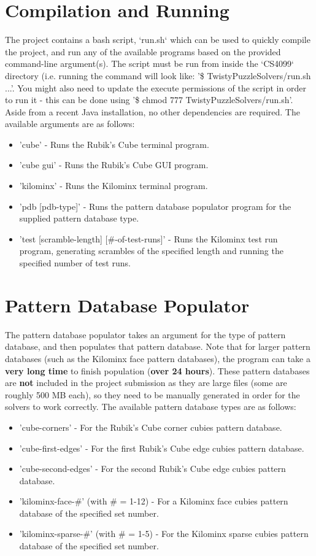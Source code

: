 \section{Compilation and Running}
The project contains a bash script, `run.sh` which can be used to quickly compile the project, and run any of the available programs based on the provided command-line argument(s). The script must be run from inside the `CS4099` directory (i.e. running the command will look like: '\$ TwistyPuzzleSolvers/run.sh ...'. You might also need to update the execute permissions of the script in order to run it - this can be done using '\$ chmod 777 TwistyPuzzleSolvers/run.sh'. Aside from a recent Java installation, no other dependencies are required. The available arguments are as follows:
\begin{itemize}
    \item 'cube' - Runs the Rubik's Cube terminal program.
    \item 'cube gui' - Runs the Rubik's Cube GUI program.
    \item 'kilominx' - Runs the Kilominx terminal program.
    \item 'pdb [pdb-type]' - Runs the pattern database populator program for the supplied pattern database type.
    \item 'test [scramble-length] [\#-of-test-runs]' - Runs the Kilominx test run program, generating scrambles of the specified length and running the specified number of test runs.
\end{itemize}

\section{Pattern Database Populator}
The pattern database populator takes an argument for the type of pattern database, and then populates that pattern database. Note that for larger pattern databases (such as the Kilominx face pattern databases), the program can take a \textbf{very long time} to finish population (\textbf{over 24 hours}). These pattern databases are \textbf{not} included in the project submission as they are large files (some are roughly 500 MB each), so they need to be manually generated in order for the solvers to work correctly. The available pattern database types are as follows:
\begin{itemize}
    \item 'cube-corners' - For the Rubik's Cube corner cubies pattern database.
    \item 'cube-first-edges' - For the first Rubik's Cube edge cubies pattern database.
    \item 'cube-second-edges' - For the second Rubik's Cube edge cubies pattern database.
    \item 'kilominx-face-\#' (with \# = 1-12) - For a Kilominx face cubies pattern database of the specified set number.
    \item 'kilominx-sparse-\#' (with \# = 1-5) - For the Kilominx sparse cubies pattern database of the specified set number.
\end{itemize}

